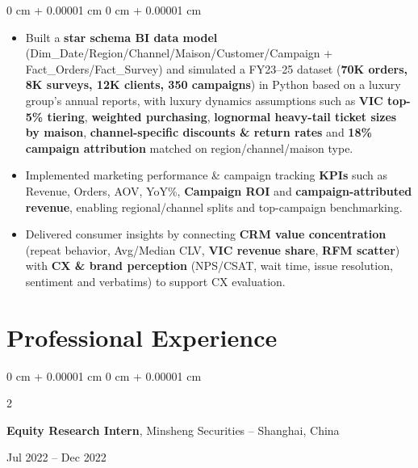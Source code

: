 \documentclass[10pt, a4paper]{article}
\newenvironment{highlights}{
    \begin{itemize}[
        topsep=0.04 cm,
        parsep=0.02cm,
        partopsep=0pt,
        itemsep=0pt,
        leftmargin=0 cm + 10pt
    ]
}{
    \end{itemize}
} %
\newenvironment{onecolentry}{
    \begin{adjustwidth}{
        0 cm + 0.00001 cm
    }{
        0 cm + 0.00001 cm
    }
}{
    \end{adjustwidth}
} %
\newenvironment{twocolentry}[2][]{
    \onecolentry
    \def\secondColumn{#2}
    \setcolumnwidth{\fill, 4.6 cm}
    \begin{paracol}{2}
}{
    \switchcolumn \raggedleft \secondColumn
    \end{paracol}
    \endonecolentry
} %
\begin{document}
        \vspace{0.10 cm}
        \begin{onecolentry}
            \begin{highlights}
                \item Built a \textbf{star schema BI data model} (Dim\_Date/Region/Channel/Maison/Customer/Campaign + Fact\_Orders/Fact\_Survey) and simulated a FY23–25 dataset (\textbf{70K orders, 8K surveys, 12K clients, 350 campaigns}) in Python based on a luxury group's annual reports, with luxury dynamics assumptions such as \textbf{VIC top-5\% tiering}, \textbf{weighted purchasing}, \textbf{lognormal heavy-tail ticket sizes by maison}, \textbf{channel-specific discounts \& return rates} and \textbf{18\% campaign attribution} matched on region/channel/maison type.
                \item Implemented marketing performance \& campaign tracking \textbf{KPIs} such as Revenue, Orders, AOV, YoY\%, \textbf{Campaign ROI} and \textbf{campaign-attributed revenue}, enabling regional/channel splits and top-campaign benchmarking.
                \item Delivered consumer insights by connecting \textbf{CRM value concentration} (repeat behavior, Avg/Median CLV, \textbf{VIC revenue share}, \textbf{RFM scatter}) with \textbf{CX \& brand perception} (NPS/CSAT, wait time, issue resolution, sentiment and verbatims) to support CX evaluation.
            \end{highlights}
        \end{onecolentry}

    \section{Professional Experience}

        \begin{twocolentry}{
            Jul 2022 – Dec 2022
        }
            \textbf{Equity Research Intern}, Minsheng Securities -- Shanghai, China
        \end{twocolentry}
\end{document}
